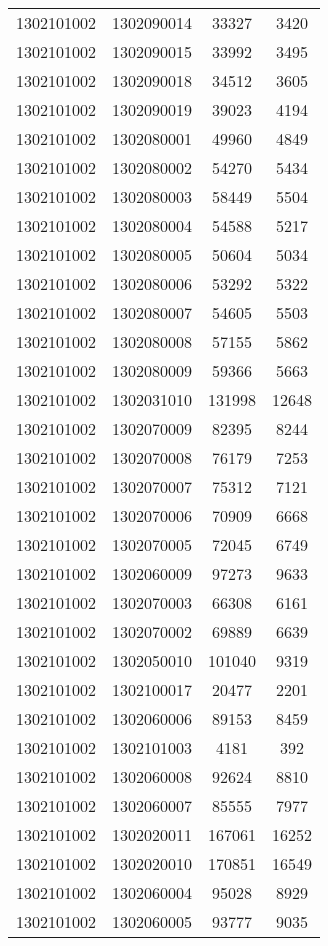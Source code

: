 \begin{longtable}[h]{llcc}
		1302101002 & 1302090014 & 33327 & 3420\\
		1302101002 & 1302090015 & 33992 & 3495\\
		1302101002 & 1302090018 & 34512 & 3605\\
		1302101002 & 1302090019 & 39023 & 4194\\
		1302101002 & 1302080001 & 49960 & 4849\\
		1302101002 & 1302080002 & 54270 & 5434\\
		1302101002 & 1302080003 & 58449 & 5504\\
		1302101002 & 1302080004 & 54588 & 5217\\
		1302101002 & 1302080005 & 50604 & 5034\\
		1302101002 & 1302080006 & 53292 & 5322\\
		1302101002 & 1302080007 & 54605 & 5503\\
		1302101002 & 1302080008 & 57155 & 5862\\
		1302101002 & 1302080009 & 59366 & 5663\\
		1302101002 & 1302031010 & 131998 & 12648\\
		1302101002 & 1302070009 & 82395 & 8244\\
		1302101002 & 1302070008 & 76179 & 7253\\
		1302101002 & 1302070007 & 75312 & 7121\\
		1302101002 & 1302070006 & 70909 & 6668\\
		1302101002 & 1302070005 & 72045 & 6749\\
		1302101002 & 1302060009 & 97273 & 9633\\
		1302101002 & 1302070003 & 66308 & 6161\\
		1302101002 & 1302070002 & 69889 & 6639\\
		1302101002 & 1302050010 & 101040 & 9319\\
		1302101002 & 1302100017 & 20477 & 2201\\
		1302101002 & 1302060006 & 89153 & 8459\\
		1302101002 & 1302101003 & 4181 & 392\\
		1302101002 & 1302060008 & 92624 & 8810\\
		1302101002 & 1302060007 & 85555 & 7977\\
		1302101002 & 1302020011 & 167061 & 16252\\
		1302101002 & 1302020010 & 170851 & 16549\\
		1302101002 & 1302060004 & 95028 & 8929\\
		1302101002 & 1302060005 & 93777 & 9035\\

\end{longtable}
